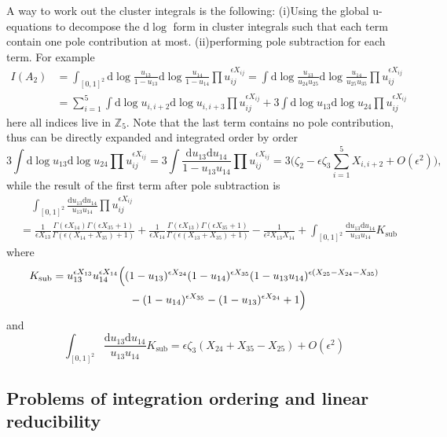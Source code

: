 \documentclass[12pt]{article}
\theoremstyle{definition}
\theoremstyle{plain}
\newcommand{\dif}{\mathrm{d}} %
\begin{document}
A way to work out the cluster integrals is the following:
(i)Using the global u-equations to decompose the $\dif \log$ form in cluster integrals such that each term contain one pole contribution at most. (ii)performing pole subtraction for each term. For example
\begin{align*}
I(A_{2})&=\int _{[0,1]^{2}} \dif \log\frac{u_{13}}{1-u_{13}} \dif \log\frac{u_{14}}{1-u_{14}} \prod u_{ij}^{\epsilon X_{ij}} 
=\int \dif \log\frac{u_{13}}{u_{24}u_{25}} \dif \log\frac{u_{14}}{u_{25}u_{35}} \prod u_{ij}^{\epsilon X_{ij}}  \\
&=\sum_{i=1}^{5}\int \dif\log u_{i,i+2}\dif\log u_{i,i+3} \prod u_{ij}^{\epsilon X_{ij}}
+ 3\int\dif \log u_{13}\dif \log u_{24}  \prod u_{ij}^{\epsilon X_{ij}}
\end{align*}
here all indices live in $\mathds{Z}_{5}$. Note that the last term contains no pole contribution, thus can be directly expanded and integrated order by order
\[
    3\int\dif \log u_{13}\dif \log u_{24}  \prod u_{ij}^{\epsilon X_{ij}}=3\int \frac{\dif u_{13}\dif u_{14}}{1-u_{13}u_{14}} \prod u_{ij}^{\epsilon X_{ij}} =3\Biggl(\zeta_{2}-\epsilon \zeta_{3}\sum_{i=1}^{5} X_{i,i+2}+O(\epsilon^{2})\Biggr),
\] 
while the result of the first term after pole subtraction is 
\begin{align*}
    &\quad \int_{[0,1]^{2}}\frac{\dif u_{13}\dif u_{14}}{u_{13}u_{14}} \prod u_{ij}^{\epsilon X_{ij}}  \\
    &=\frac{1}{\epsilon X_{13}}\frac{\Gamma(\epsilon X_{14})\Gamma(\epsilon X_{35}+1)}{\Gamma(\epsilon (X_{14}+X_{35})+1)}
    +\frac{1}{\epsilon X_{14}}\frac{\Gamma(\epsilon X_{13})\Gamma(\epsilon X_{35}+1)}{\Gamma(\epsilon (X_{13}+X_{35})+1)} 
    -\frac{1}{\epsilon^{2}X_{13}X_{14}} +\int_{[0,1]^{2}}\frac{\dif u_{13}\dif u_{14}}{u_{13}u_{14}} K_{\text{sub}}
\end{align*}
where 
\begin{align*}
    K_{\text{sub}}&=u_{13}^{\epsilon X_{13}} u_{14}^{\epsilon X_{14}}\Bigl((1-u_{13})^{\epsilon X_{24}}(1-u_{14})^{\epsilon X_{35}} (1-u_{13}u_{14})^{\epsilon(X_{25}-X_{24}-X_{35})} \\
    &\quad \qquad\qquad\qquad-(1-u_{14})^{\epsilon X_{35}}-(1-u_{13})^{\epsilon X_{24}}+1 \Bigr)\\
\end{align*}
and
\[
    \int_{[0,1]^{2}}\frac{\dif u_{13}\dif u_{14}}{u_{13}u_{14}} K_{\text{sub}}=\epsilon\zeta_{3}(X_{24}+X_{35}-X_{25})+O(\epsilon^{2})    
\]
\fi

\subsection{Problems of integration ordering and linear reducibility}
\end{document}
